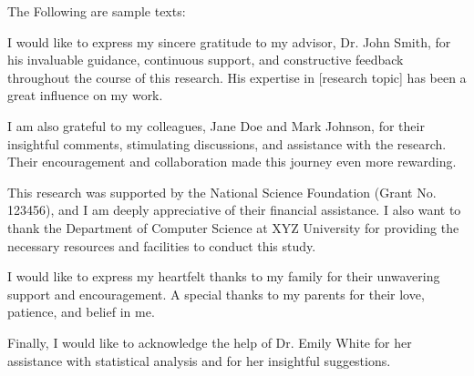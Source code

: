 \begin{acknowledge}
The Following are sample texts:

\vspace{1\baselineskip}

I would like to express my sincere gratitude to my advisor, Dr. John Smith, for his invaluable guidance, continuous support, and constructive feedback throughout the course of this research. His expertise in [research topic] has been a great influence on my work.

\vspace{2\baselineskip}

I am also grateful to my colleagues, Jane Doe and Mark Johnson, for their insightful comments, stimulating discussions, and assistance with the research. Their encouragement and collaboration made this journey even more rewarding.

\vspace{2\baselineskip}

This research was supported by the National Science Foundation (Grant No. 123456), and I am deeply appreciative of their financial assistance. I also want to thank the Department of Computer Science at XYZ University for providing the necessary resources and facilities to conduct this study.

\vspace{2\baselineskip}

I would like to express my heartfelt thanks to my family for their unwavering support and encouragement. A special thanks to my parents for their love, patience, and belief in me.

\vspace{2\baselineskip}

Finally, I would like to acknowledge the help of Dr. Emily White for her assistance with statistical analysis and for her insightful suggestions.
\end{acknowledge}